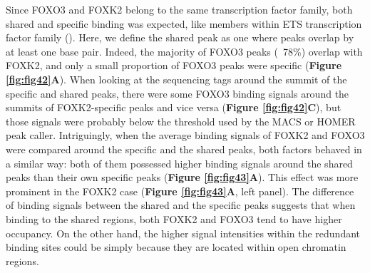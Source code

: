 Since FOXO3 and FOXK2 belong to the same transcription factor family, both shared and specific binding was expected, like members within ETS transcription factor family (\cite{hollenhorst2001mechanisms,wei2010genome-wide}). Here, we define the shared peak as one where peaks overlap by at least one base pair. Indeed, the majority of FOXO3 peaks (~78\%) overlap with FOXK2, and only a small proportion of FOXO3 peaks were specific (\textbf{Figure \ref{fig:fig42}A}). When looking at the sequencing tags around the summit of the specific and shared peaks, there were some FOXO3 binding signals around the summits of FOXK2-specific peaks and vice versa (\textbf{Figure \ref{fig:fig42}C}), but those signals were probably below the threshold used by the MACS or HOMER peak caller. Intriguingly, when the average binding signals of FOXK2 and FOXO3 were compared around the specific and the shared peaks, both factors behaved in a similar way: both of them possessed higher binding signals around the shared peaks than their own specific peaks (\textbf{Figure \ref{fig:fig43}A}). This effect was more prominent in the FOXK2 case (\textbf{Figure \ref{fig:fig43}A}, left panel). The difference of binding signals between the shared and the specific peaks suggests that when binding to the shared regions, both FOXK2 and FOXO3 tend to have higher occupancy. On the other hand, the higher signal intensities within the redundant binding sites could be simply because they are located within open chromatin regions.

